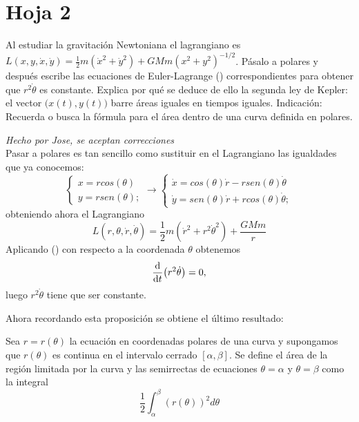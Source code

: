 \section{Hoja 2}
\begin{problem}[8] Al estudiar la gravitación Newtoniana el lagrangiano es 
	$L(x,y,\dot{x},\dot{y})=\frac 12 m(\dot{x}^2+\dot{y}^2)+GMm(x^2+y^2)^{-1/2}$. 
	Pásalo a polares y después escribe las ecuaciones de Euler-Lagrange () correspondientes para obtener  que $r^2\dot{\theta}$ es constante. Explica por qué se deduce de ello la segunda ley de Kepler: el vector $\big(x(t),y(t)\big)$ barre áreas iguales en tiempos iguales. 
	{\sf Indicación:} Recuerda o busca la fórmula para el área dentro de una curva definida en polares.
	
	\solution\textit{Hecho por Jose, se aceptan correcciones}\\ Pasar a polares es tan sencillo como sustituir en el Lagrangiano las igualdades que ya conocemos:
	$$\begin{cases}x=rcos(\theta)\\y=rsen(\theta);
	\end{cases}\longrightarrow\begin{cases}\dot{x}=cos(\theta)\dot{r}-rsen(\theta)\dot{\theta}\\\dot{y}=sen(\theta)\dot{r}+rcos(\theta)\dot{\theta};
	\end{cases}$$ obteniendo ahora el Lagrangiano $$L(r,\theta,\dot{r},\dot{\theta})=\frac{1}{2}m(\dot{r}^2+r^2\dot{\theta}^2)+\frac{GMm}{r}$$ Aplicando () con respecto a la coordenada $\theta$ obtenemos $$\dv{t}(r^2\dot{\theta})=0,$$ luego $r^2\dot{\theta}$ tiene que ser constante.
	
	Ahora recordando esta proposición se obtiene el último resultado:
	\begin{prop}Sea $r =r(θ)$ la ecuación en coordenadas polares de una curva y supongamos que $r(θ)$ es continua en el intervalo cerrado $[α,β]$. Se define el área de la región limitada por la curva y las semirrectas de ecuaciones $θ =α$ y $θ = β$ como la integral $$\frac{1}{2}\int_{\alpha}^{\beta}(r(\theta))^2d\theta$$
	\end{prop}
\end{problem}
